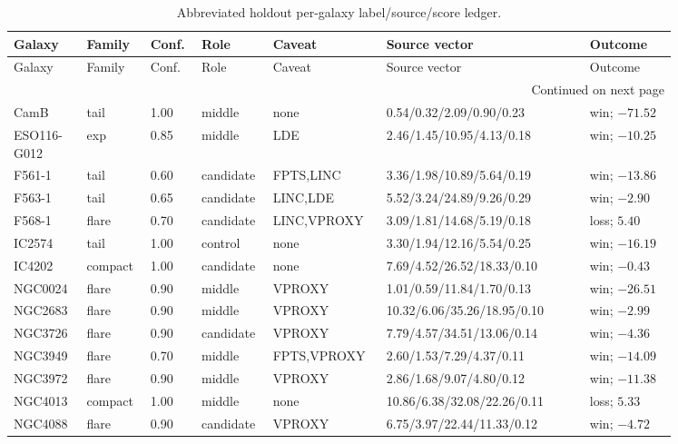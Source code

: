 \documentclass[11pt]{article}
\begin{document}
\begin{landscape}
\begingroup
\small
\setlength{\tabcolsep}{3pt}
\begin{longtable}{@{}p{0.105\linewidth}p{0.070\linewidth}p{0.060\linewidth}p{0.085\linewidth}p{0.130\linewidth}p{0.280\linewidth}p{0.120\linewidth}@{}}
\caption{Abbreviated holdout per-galaxy label/source/score ledger.}
\label{tab:holdout-ledger}\\
\toprule
Galaxy & Family & Conf. & Role & Caveat & Source vector & Outcome\\
\midrule
\endfirsthead
\toprule
Galaxy & Family & Conf. & Role & Caveat & Source vector & Outcome\\
\midrule
\endhead
\midrule
\multicolumn{7}{r}{Continued on next page}\\
\midrule
\endfoot
\bottomrule
\endlastfoot
CamB & tail & 1.00 & middle & none & 0.54/0.32/2.09/0.90/0.23 & win; $-71.52$ \\
ESO116-G012 & exp & 0.85 & middle & LDE & 2.46/1.45/10.95/4.13/0.18 & win; $-10.25$ \\
F561-1 & tail & 0.60 & candidate & FPTS,LINC & 3.36/1.98/10.89/5.64/0.19 & win; $-13.86$ \\
F563-1 & tail & 0.65 & candidate & LINC,LDE & 5.52/3.24/24.89/9.26/0.29 & win; $-2.90$ \\
F568-1 & flare & 0.70 & candidate & LINC,VPROXY & 3.09/1.81/14.68/5.19/0.18 & loss; $5.40$ \\
IC2574 & tail & 1.00 & control & none & 3.30/1.94/12.16/5.54/0.25 & win; $-16.19$ \\
IC4202 & compact & 1.00 & candidate & none & 7.69/4.52/26.52/18.33/0.10 & win; $-0.43$ \\
NGC0024 & flare & 0.90 & middle & VPROXY & 1.01/0.59/11.84/1.70/0.13 & win; $-26.51$ \\
NGC2683 & flare & 0.90 & middle & VPROXY & 10.32/6.06/35.26/18.95/0.10 & win; $-2.99$ \\
NGC3726 & flare & 0.90 & candidate & VPROXY & 7.79/4.57/34.51/13.06/0.14 & win; $-4.36$ \\
NGC3949 & flare & 0.70 & middle & FPTS,VPROXY & 2.60/1.53/7.29/4.37/0.11 & win; $-14.09$ \\
NGC3972 & flare & 0.90 & middle & VPROXY & 2.86/1.68/9.07/4.80/0.12 & win; $-11.38$ \\
NGC4013 & compact & 1.00 & middle & none & 10.86/6.38/32.08/22.26/0.11 & loss; $5.33$ \\
NGC4088 & flare & 0.90 & candidate & VPROXY & 6.75/3.97/22.44/11.33/0.12 & win; $-4.72$ \\

\end{longtable}
\end{landscape}
\end{document}
